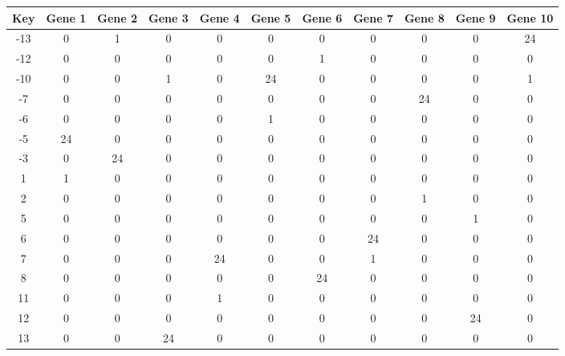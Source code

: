 \begin{tabular}{|c|c|c|c|c|c|c|c|c|c|c|}
\hline
Key & Gene 1 & Gene 2 & Gene 3 & Gene 4 & Gene 5 & Gene 6 & Gene 7 & Gene 8 & Gene 9 & Gene 10 \\
\hline
-13 & 0 & 1 & 0 & 0 & 0 & 0 & 0 & 0 & 0 & 24 \\
-12 & 0 & 0 & 0 & 0 & 0 & 1 & 0 & 0 & 0 & 0 \\
-10 & 0 & 0 & 1 & 0 & 24 & 0 & 0 & 0 & 0 & 1 \\
-7 & 0 & 0 & 0 & 0 & 0 & 0 & 0 & 24 & 0 & 0 \\
-6 & 0 & 0 & 0 & 0 & 1 & 0 & 0 & 0 & 0 & 0 \\
-5 & 24 & 0 & 0 & 0 & 0 & 0 & 0 & 0 & 0 & 0 \\
-3 & 0 & 24 & 0 & 0 & 0 & 0 & 0 & 0 & 0 & 0 \\
1 & 1 & 0 & 0 & 0 & 0 & 0 & 0 & 0 & 0 & 0 \\
2 & 0 & 0 & 0 & 0 & 0 & 0 & 0 & 1 & 0 & 0 \\
5 & 0 & 0 & 0 & 0 & 0 & 0 & 0 & 0 & 1 & 0 \\
6 & 0 & 0 & 0 & 0 & 0 & 0 & 24 & 0 & 0 & 0 \\
7 & 0 & 0 & 0 & 24 & 0 & 0 & 1 & 0 & 0 & 0 \\
8 & 0 & 0 & 0 & 0 & 0 & 24 & 0 & 0 & 0 & 0 \\
11 & 0 & 0 & 0 & 1 & 0 & 0 & 0 & 0 & 0 & 0 \\
12 & 0 & 0 & 0 & 0 & 0 & 0 & 0 & 0 & 24 & 0 \\
13 & 0 & 0 & 24 & 0 & 0 & 0 & 0 & 0 & 0 & 0 \\
\hline
\end{tabular}